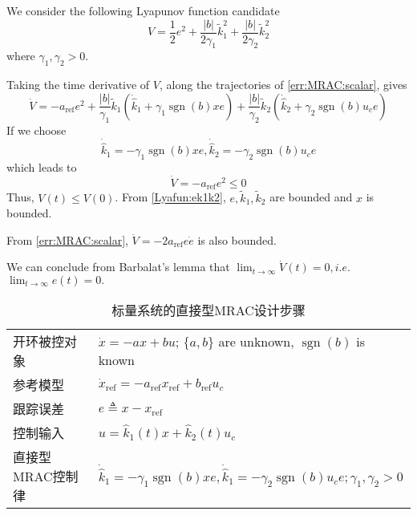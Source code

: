 We consider the following Lyapunov function candidate
\begin{equation}
  V = \frac{1}{2} e^2 + \frac{| b |}{2 \gamma_1} \tilde{k}^2_1 + \frac{| b
  |}{2 \gamma_2} \tilde{k}^2_2 \label{Lyafun:ek1k2}
\end{equation}
where $\gamma_1, \gamma_2 > 0$.

Taking the time derivative of $V$, along the trajectories of
\eqref{err:MRAC:scalar}, gives
\[ \dot{V} = - a_{\ensuremath{\operatorname{ref}}} e^2 + \frac{| b
   |}{\gamma_1} \widetilde{ k} _1 (\dot{\hat{k}}_1 + \gamma_1
   \ensuremath{\operatorname{sgn}} (b) x  e) + \frac{| b |}{\gamma_2}
   \tilde{k} _2 (\dot{\hat{k}}_2 + \gamma_2 \ensuremath{\operatorname{sgn}}
   (b)  u_c e) \]
If we choose
\begin{equation}
  \dot{\hat{k}}_1 = -  \gamma_1 \ensuremath{\operatorname{sgn}} (b) x  e,
  \dot{\hat{k}}_2 = -  \gamma_2 \ensuremath{\operatorname{sgn}} (b)  u_c e
\end{equation}
which leads to
\begin{equation}
  \dot{V} = - a_{\ensuremath{\operatorname{ref}}} e^2 \leq 0
\end{equation}
Thus, $V (t) \leq V (0)$. From \eqref{Lyafun:ek1k2}, $e, \tilde{k} _1,
\tilde{k} _2$ are bounded and $x$ is bounded.

From \eqref{err:MRAC:scalar}, $\ddot{V} = - 2
a_{\ensuremath{\operatorname{ref}}} e  \dot{e}$ is also bounded.

We can conclude from Barbalat's lemma that $\lim_{t \rightarrow \infty}
\dot{V} (t) = 0, i.e.$ $\lim_{t \rightarrow \infty} e (t) = 0.$

\begin{table}[h]
  \centering
  \caption{标量系统的直接型MRAC设计步骤}
  \begin{tabular}{p{4.0cm}p{10.0cm}}
    \hline
    开环被控对象 & $\dot{x} = - a  x + b  u$; $\{ a, b \}$ are unknown,
    $\ensuremath{\operatorname{sgn}} (b)$ is known\\
    参考模型 & $\dot{x}_{\ensuremath{\operatorname{ref}}} = -
    a_{\ensuremath{\operatorname{ref}}} x_{\ensuremath{\operatorname{ref}}} +
    b_{\ensuremath{\operatorname{ref}}} u_c$\\
    跟踪误差 & $e \triangleq x - x_{\ensuremath{\operatorname{ref}}}$\\
    控制输入 & $u = \hat{k}_1 (t) x + \hat{k}_2 (t) u_c$\\
    直接型MRAC控制律& $\dot{\hat{k}}_1 = -  \gamma_1
    \ensuremath{\operatorname{sgn}} (b) x  e, \dot{\hat{k}}_1 = -  \gamma_2
    \ensuremath{\operatorname{sgn}} (b)  u_c e ; \gamma_1, \gamma_2 > 0$\\
    \hline
  \end{tabular}
\end{table}

